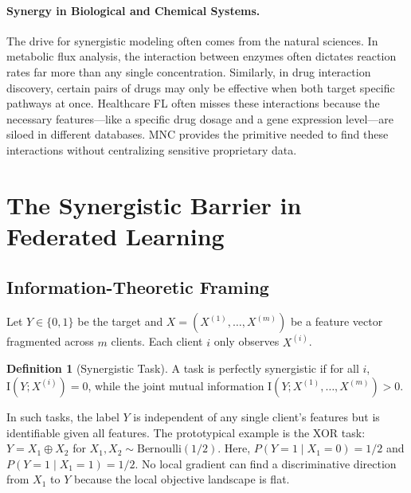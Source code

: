 \documentclass{article}
\theoremstyle{plain}
\theoremstyle{definition}
\newtheorem{definition}[theorem]{Definition}
\newcommand{\I}{\mathrm{I}}
\begin{document}
\paragraph{Synergy in Biological and Chemical Systems.} The drive for synergistic modeling often comes from the natural sciences. In metabolic flux analysis, the interaction between enzymes often dictates reaction rates far more than any single concentration. Similarly, in drug interaction discovery, certain pairs of drugs may only be effective when both target specific pathways at once. Healthcare FL often misses these interactions because the necessary features—like a specific drug dosage and a gene expression level—are siloed in different databases. MNC provides the primitive needed to find these interactions without centralizing sensitive proprietary data.

\section{The Synergistic Barrier in Federated Learning}
\label{sec:theory}
\subsection{Information-Theoretic Framing}
Let $Y \in \{0, 1\}$ be the target and $X = (X^{(1)}, \dots, X^{(m)})$ be a feature vector fragmented across $m$ clients. Each client $i$ only observes $X^{(i)}$.
\begin{definition}[Synergistic Task]
A task is perfectly synergistic if for all $i$, $\I(Y; X^{(i)}) = 0$, while the joint mutual information $\I(Y; X^{(1)}, \dots, X^{(m)}) > 0$.
\end{definition}
In such tasks, the label $Y$ is independent of any single client's features but is identifiable given all features. The prototypical example is the XOR task: $Y = X_1 \oplus X_2$ for $X_1, X_2 \sim \text{Bernoulli}(1/2)$. Here, $P(Y=1 \mid X_1=0) = 1/2$ and $P(Y=1 \mid X_1=1) = 1/2$. No local gradient can find a discriminative direction from $X_1$ to $Y$ because the local objective landscape is flat.
\end{document}

